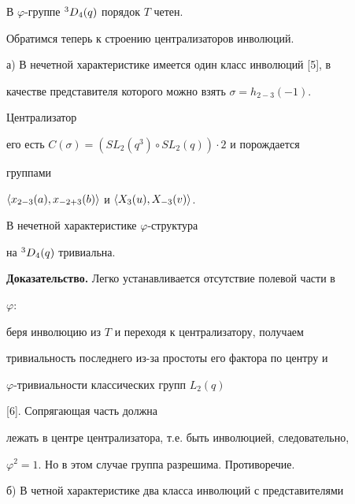  


\begin{cor} 


В $\varphi$-группе ${}^3D_4(q)$ порядок $T$ четен. 


\end{cor} 


 


Обратимся теперь к строению централизаторов инволюций. 


 


а) В нечетной характеристике имеется один класс инволюций [5], в  


качестве представителя которого можно взять $\sigma=h_{2-3}(-1)$. 


Централизатор  


его есть $C(\sigma)=(SL_2(q^3)\circ SL_2(q))\cdot 2$ и порождается 


группами 


$\langle x_{2-3}(a),x_{-2+3}(b)\rangle$ и $\langle X_3(u),X_{-3}(v)\rangle$. 


 


\begin{cor} 


В нечетной характеристике $\varphi$-структура 


на ${}^3D_4(q)$ тривиальна.  


\end{cor} 


 


{\bf Доказательство.} Легко устанавливается отсутствие полевой части в 


$\varphi$: 


беря инволюцию из $T$ и переходя к централизатору, получаем  


тривиальность последнего из-за простоты его фактора по центру и 


$\varphi$-тривиальности классических групп $L_2(q)$ 


[6]. Сопрягающая часть должна  


лежать в центре централизатора, т.е. быть инволюцией, следовательно,  


$\varphi^2=1$. Но в этом случае группа разрешима. Противоречие. 


 


б) В четной характеристике два класса инволюций с представителями 


